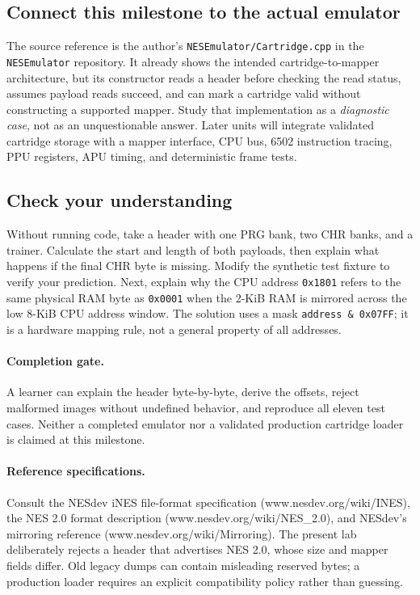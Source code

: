 \subsection{Connect this milestone to the actual emulator}

The source reference is the author's
\texttt{NESEmulator/Cartridge.cpp} in the \texttt{NESEmulator} repository.
It already shows the intended cartridge-to-mapper architecture, but its
constructor reads a header before checking the read status, assumes payload
reads succeed, and can mark a cartridge valid without constructing a
supported mapper. Study that implementation as a \emph{diagnostic case},
not as an unquestionable answer. Later units will integrate validated
cartridge storage with a mapper interface, CPU bus, 6502 instruction tracing,
PPU registers, APU timing, and deterministic frame tests.

\subsection{Check your understanding}

Without running code, take a header with one PRG bank, two CHR banks, and a
trainer. Calculate the start and length of both payloads, then explain what
happens if the final CHR byte is missing. Modify the synthetic test fixture
to verify your prediction. Next, explain why the CPU address \texttt{0x1801}
refers to the same physical RAM byte as \texttt{0x0001} when the 2-KiB RAM is
mirrored across the low 8-KiB CPU address window. The solution uses a mask
\texttt{address \& 0x07FF}; it is a hardware mapping rule, not a general
property of all addresses.

\paragraph{Completion gate.} A learner can explain the header byte-by-byte,
derive the offsets, reject malformed images without undefined behavior,
and reproduce all eleven test cases. Neither a completed emulator nor a
validated production cartridge loader is claimed at this milestone.

\paragraph{Reference specifications.} Consult the NESdev iNES file-format
specification (www.nesdev.org/wiki/INES), the NES 2.0 format description
(www.nesdev.org/wiki/NES\_2.0), and NESdev's mirroring reference
(www.nesdev.org/wiki/Mirroring). The present lab deliberately rejects a
header that advertises NES 2.0, whose size and mapper fields differ. Old
legacy dumps can contain misleading reserved bytes; a production loader
requires an explicit compatibility policy rather than guessing.
